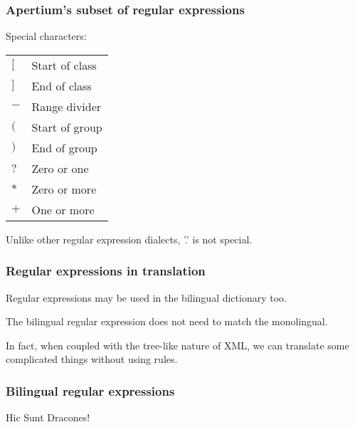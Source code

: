 \documentclass{beamer} %
\begin{document}
\begin{frame}
  \frametitle{Apertium's subset of regular expressions}

  \begin{exampleblock}{Special characters:}
    \begin{tabular}{ll}
      $[$ & Start of class \\
      $]$ & End of class \\
      \hline
      $-$ & Range divider \\
      \hline
      $($ & Start of group \\
      $)$ & End of group \\
      \hline
      $?$ & Zero or one \\
      $*$ & Zero or more \\
      $+$ & One or more \\
    \end{tabular}
  \end{exampleblock}

  Unlike other regular expression dialects, '.' is not special.
\end{frame}
\begin{frame}
  \frametitle{Regular expressions in translation}

  Regular expressions may be used in the bilingual dictionary too.

  The bilingual regular expression does not need to match the monolingual.

  \pause

  In fact, when coupled with the tree-like nature of XML, we can translate some complicated things 
  without using rules.
\end{frame}
\begin{frame}
\frametitle{Bilingual regular expressions}

 \begin{center}
 {\Large Hic Sunt Dracones!}
 \end{center}
\end{frame}
\end{document}
